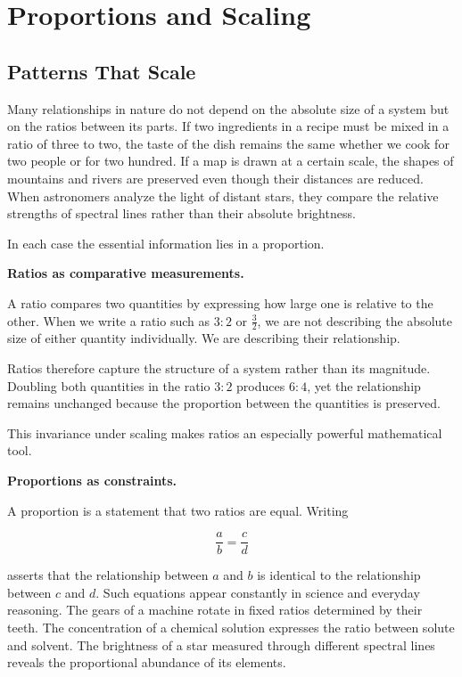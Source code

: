 \documentclass[11pt, openany]{book}
\theoremstyle{plain}
\theoremstyle{definition}
\theoremstyle{remark}
\begin{document}
\chapter{Proportions and Scaling}

\section*{Patterns That Scale}

Many relationships in nature do not depend on the absolute size of a
system but on the ratios between its parts. If two ingredients in a
recipe must be mixed in a ratio of three to two, the taste of the dish
remains the same whether we cook for two people or for two hundred. If a
map is drawn at a certain scale, the shapes of mountains and rivers are
preserved even though their distances are reduced. When astronomers
analyze the light of distant stars, they compare the relative strengths
of spectral lines rather than their absolute brightness.

In each case the essential information lies in a proportion.

\medskip

\textbf{Ratios as comparative measurements.}

A ratio compares two quantities by expressing how large one is relative
to the other. When we write a ratio such as $3:2$ or $\frac{3}{2}$, we are
not describing the absolute size of either quantity individually. We are
describing their relationship.

Ratios therefore capture the structure of a system rather than its
magnitude. Doubling both quantities in the ratio $3:2$ produces $6:4$,
yet the relationship remains unchanged because the proportion between
the quantities is preserved.

This invariance under scaling makes ratios an especially powerful
mathematical tool.

\medskip

\textbf{Proportions as constraints.}

A proportion is a statement that two ratios are equal. Writing

\[
\frac{a}{b}=\frac{c}{d}
\]

asserts that the relationship between $a$ and $b$ is identical to the
relationship between $c$ and $d$. Such equations appear constantly in
science and everyday reasoning. The gears of a machine rotate in fixed
ratios determined by their teeth. The concentration of a chemical
solution expresses the ratio between solute and solvent. The brightness
of a star measured through different spectral lines reveals the
proportional abundance of its elements.
\end{document}
